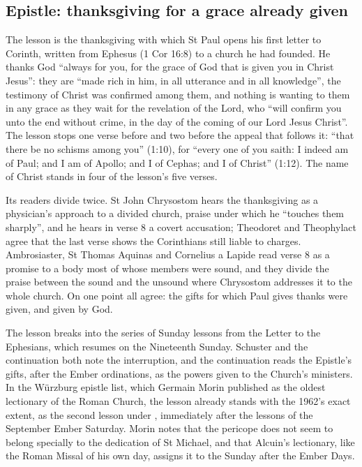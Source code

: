 \subsection{Epistle: thanksgiving for a grace already given}

The lesson is the thanksgiving with which St Paul opens his first letter to
Corinth, written from Ephesus (1 Cor 16:8) to a church he had founded. He
thanks God ``always for you, for the grace of God that is given you in Christ
Jesus'': they are ``made rich in him, in all utterance and in all knowledge'',
the testimony of Christ was confirmed among them, and nothing is wanting to
them in any grace as they wait for the revelation of the Lord, who ``will
confirm you unto the end without crime, in the day of the coming of our Lord
Jesus Christ''. The lesson stops one verse before  and two
before the appeal that follows it: ``that there be no schisms among you''
(1:10), for ``every one of you saith: I indeed am of Paul; and I am of Apollo;
and I of Cephas; and I of Christ'' (1:12). The name of Christ stands in four of
the lesson's five verses.

Its readers divide twice. St John Chrysostom hears the thanksgiving as a
physician's approach to a divided church, praise under which he ``touches them
sharply'', and he hears in verse 8 a covert accusation; Theodoret and
Theophylact agree that the last verse shows the Corinthians still liable to
charges. Ambrosiaster, St Thomas Aquinas and Cornelius a Lapide read verse 8 as
a promise to a body most of whose members were sound, and they divide the
praise between the sound and the unsound where Chrysostom addresses it to the
whole church. On one point all agree: the gifts for which Paul gives thanks
were given, and given by God.

The lesson breaks into the series of Sunday lessons from the Letter to the
Ephesians, which resumes on the Nineteenth Sunday. Schuster and the
continuation both note the interruption, and the continuation reads the
Epistle's gifts, after the Ember ordinations, as the powers given to the
Church's ministers. In the Würzburg epistle list, which Germain Morin published
as the oldest lectionary of the Roman Church, the lesson already stands with
the 1962's exact extent, as the second lesson under ,
immediately after the lessons of the September Ember Saturday. Morin notes that
the pericope does not seem to belong specially to the dedication of St
Michael, and that Alcuin's lectionary, like the Roman Missal of his own day,
assigns it to the Sunday after the Ember Days.

